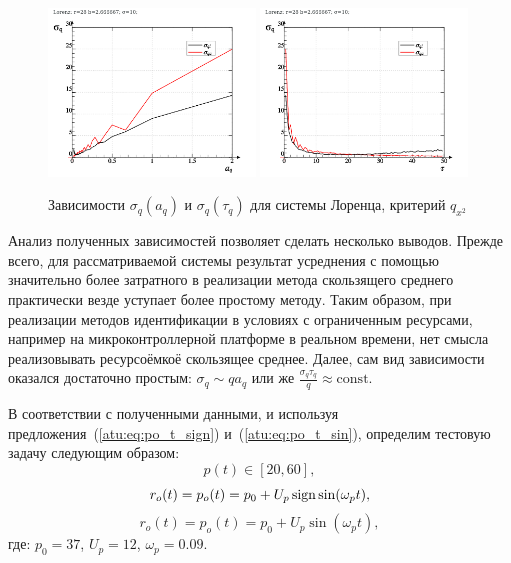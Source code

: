 \begin{figure}[h!]
\begin{center}
  \includegraphics[width=0.49\textwidth]{p/cha/lor/lor_qx2_tau-p_aq_sd.png}
  \hfill
  \includegraphics[width=0.49\textwidth]{p/cha/lor/lor_qx2_tau-p_tau_sd.png}
\end{center}
  \caption{Зависимости $\sigma_{q}(a_q)$ и $\sigma_{q}(\tau_q)$ для системы Лоренца, критерий $q_{x^2}$}
\label{atu:f:lor_qx2_tau}
\end{figure}

Анализ полученных зависимостей позволяет сделать
несколько выводов. Прежде всего, для рассматриваемой системы
результат усреднения с помощью значительно более затратного
в реализации метода скользящего среднего практически везде
уступает более простому методу. Таким образом,
при реализации методов идентификации в условиях с ограниченным ресурсами,
например на микроконтроллерной платформе в реальном времени,
нет смысла реализовывать ресурсоёмкоё скользящее среднее.
Далее, сам вид зависимости оказался достаточно простым:
$ \sigma_q \sim q a_q $ или же
$ \frac{\sigma_q \tau_q}{q} \approx \mathrm{const}$.

В соответствии с полученными данными, и используя
предложения~(\ref{atu:eq:po_t_sign}) и~(\ref{atu:eq:po_t_sin}),
определим тестовую задачу следующим образом:
\[
  p(t) \in [20, 60],
\]
%
\begin{equation}
  r_o(t) = p_o(t) = p_0 +  U_{p} \operatorname*{sign} \sin( \omega_{p} t ),
  \label{atu:eq:lor_po_t_sign}
\end{equation}
%
%
\begin{equation}
  r_o(t) = p_o(t) = p_0 +  U_{p} \sin( \omega_{p} t ),
  \label{atu:eq:lor_po_t_sin}
\end{equation}
%
где:
$p_0 = 37$, $U_p=12$, $\omega_p=0.09$.


